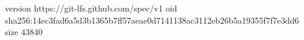 version https://git-lfs.github.com/spec/v1
oid sha256:14ec3fad6a5d3b1365b7ff57aeae0d7141138ac3112eb26b5a19355f7f7e3dd6
size 43840
